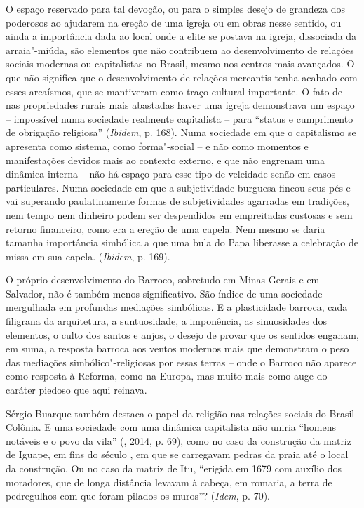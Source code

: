 {O espaço reservado para tal devoção, ou para o simples desejo de
grandeza dos poderosos ao ajudarem na ereção de uma igreja ou em obras
nesse sentido, ou ainda a importância dada ao local onde a elite se
postava na igreja, dissociada da arraia"-miúda, são elementos que não
contribuem ao desenvolvimento de relações sociais modernas ou
capitalistas no Brasil, mesmo nos centros mais avançados. O que não
significa que o desenvolvimento de relações mercantis tenha acabado com
esses arcaísmos, que se mantiveram como traço cultural importante. O fato de nas
propriedades rurais mais abastadas haver uma igreja demonstrava um
espaço -- impossível numa sociedade realmente capitalista -- para
``status e cumprimento de obrigação religiosa'' (\emph{Ibidem}, p. 168).
Numa sociedade em que o capitalismo se apresenta como sistema, como
forma"-social -- e não como momentos e manifestações devidos mais ao
contexto externo, e que não engrenam uma dinâmica interna -- não há
espaço para esse tipo de veleidade senão em casos particulares.
Numa sociedade em que a subjetividade burguesa fincou seus pés e vai superando
paulatinamente formas de subjetividades agarradas em tradições, nem tempo nem dinheiro
podem ser despendidos em empreitadas custosas e sem retorno financeiro,
como era a ereção de uma capela. Nem mesmo se daria tamanha importância
simbólica a que uma bula do Papa liberasse a celebração de missa em sua
capela. (\emph{Ibidem}, p. 169).

O próprio desenvolvimento do Barroco,
sobretudo em Minas Gerais e em Salvador, não é também menos
significativo. São índice de uma sociedade mergulhada em profundas
mediações simbólicas. E a plasticidade barroca, cada filigrana da
arquitetura, a suntuosidade, a imponência, as sinuosidades dos
elementos, o culto dos santos e anjos, o desejo de provar que os
sentidos enganam, em suma, a resposta barroca aos ventos modernos mais
que demonstram o peso das mediações simbólico"-religiosas por essas
terras -- onde o Barroco não aparece como resposta à Reforma, como na
Europa, mas muito mais como auge do caráter piedoso que aqui
reinava.

Sérgio Buarque também destaca o papel da religião nas relações sociais
do Brasil Colônia. E uma sociedade com uma dinâmica capitalista
não uniria ``homens notáveis e o povo da vila'' (, 2014, p. 69),
como no caso da construção da matriz de Iguape, em fins do século ,
em que se carregavam pedras da praia até o local da construção. Ou no
caso da matriz de Itu, ``erigida em 1679 com auxílio dos moradores, que
de longa distância levavam à cabeça, em romaria, a terra de pedregulhos
com que foram pilados os muros''? (\emph{Idem}, p. 70).

}
